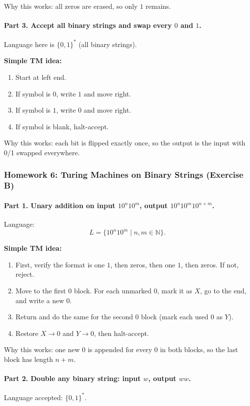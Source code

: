 \documentclass{article}
\theoremstyle{theorem}
\theoremstyle{definition}
\theoremstyle{remark}
\begin{document}
Why this works: all zeros are erased, so only $1$ remains.

\paragraph{Part 3. Accept all binary strings and swap every $0$ and $1$.}
Language here is $\{0,1\}^*$ (all binary strings).

\textbf{Simple TM idea:}
\begin{enumerate}
  \item Start at left end.
  \item If symbol is $0$, write $1$ and move right.
  \item If symbol is $1$, write $0$ and move right.
  \item If symbol is blank, halt-accept.
\end{enumerate}

Why this works: each bit is flipped exactly once, so the output is the input with 0/1 swapped everywhere.

\subsubsection{Homework 6: Turing Machines on Binary Strings (Exercise B)}

\paragraph{Part 1. Unary addition on input $10^n10^m$, output $10^n10^m10^{n+m}$.}
Language:
\[
L=\{10^n10^m\mid n,m\in\mathbb{N}\}.
\]

\textbf{Simple TM idea:}
\begin{enumerate}
  \item First, verify the format is one $1$, then zeros, then one $1$, then zeros. If not, reject.
  \item Move to the first $0$ block. For each unmarked $0$, mark it as $X$, go to the end, and write a new $0$.
  \item Return and do the same for the second $0$ block (mark each used $0$ as $Y$).
  \item Restore $X\to 0$ and $Y\to 0$, then halt-accept.
\end{enumerate}

Why this works: one new $0$ is appended for every $0$ in both blocks, so the last block has length $n+m$.

\paragraph{Part 2. Double any binary string: input $w$, output $ww$.}
Language accepted: $\{0,1\}^*$.
\end{document}
